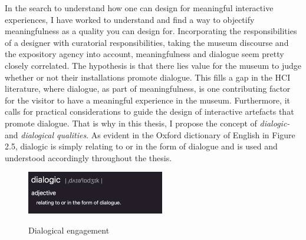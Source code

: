 In the search to understand how one can design for meaningful interactive experiences, I have worked to understand and find a way to objectify meaningfulness as a quality you can design for. Incorporating the responsibilities of a designer with curatorial responsibilities, taking the museum discourse and the expository agency into account,  meaningfulness and dialogue seem pretty closely correlated. The hypothesis is that there lies value for the museum to judge whether or not their installations promote dialogue. This fills a gap in the HCI literature, where dialogue, as part of meaningfulness, is one contributing factor for the visitor to have a meaningful experience in the museum. Furthermore, it calls for practical considerations to guide the design of interactive artefacts that promote dialogue. That is why in this thesis, I propose the concept of \emph{dialogic-} and \emph{dialogical qualities}. As evident in the Oxford dictionary of English in Figure 2.5, dialogic is simply relating to or in the form of dialogue and is used and understood accordingly throughout the thesis.

\begin{figure}[H]
\centering
\includegraphics[width=6cm]{pictures/background/dialogic.png}
\caption{Dialogical engagement}{\autocite{Oxford_dictionary}}
\end{figure}


